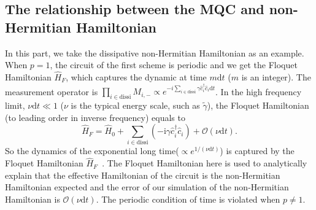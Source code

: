 \documentclass[longbibliography, aps, prx, amsmath, amssymb, amsfonts, twocolumn,superscriptaddress, footinbib]{revtex4-1}
\begin{document}

	\subsection{The relationship between the MQC and non-Hermitian Hamiltonian}
	
	In this part, we take the dissipative non-Hermitian Hamiltonian as an example. When $p=1$, the circuit of the first scheme is periodic and we get the Floquet Hamiltonian $\hat{H}_{F}$, which captures the dynamic at time $m \mathrm{d}t$ ($m$ is an integer). 
	The measurement operator is $\prod_{i\in \text{dissi}} M_{i, -} \propto e^{-i\sum_{i\in \text{dissi}} \gamma \hat{c}_i^{\dagger} \hat{c}_i \mathrm{d}t}$. In the high frequency limit, $\nu\mathrm{d}t \ll 1$ ($\nu$ is the typical energy scale, such as $\tilde{\gamma}$), the Floquet Hamiltonian (to leading order in inverse frequency) equals to~\cite{bukov2015universal,RN694}
	\begin{equation}
		\hat{H}_F = \hat{H}_0 + \sum_{i\in \text{dissi} } (-\mathrm{i}\gamma \hat{c}_i^{\dagger} \hat{c}_i) + \mathcal{O}(\nu \mathrm{d} t).
	\end{equation}
	So the dynamics of the exponential long time($\propto e^{1/(\nu \mathrm{d} t)}$) is captured by the Floquet Hamiltonian $\hat{H}_F$~\cite{RN1228}. The Floquet Hamiltonian here is used to analytically explain that the effective Hamiltonian of the circuit is the non-Hermitian Hamiltonian expected and the error of our simulation of the non-Hermitian Hamiltonian is $\mathcal{O}(\nu \mathrm{d} t)$.
	The periodic condition of time is violated when $p\neq 1$. 
	
\end{document}
